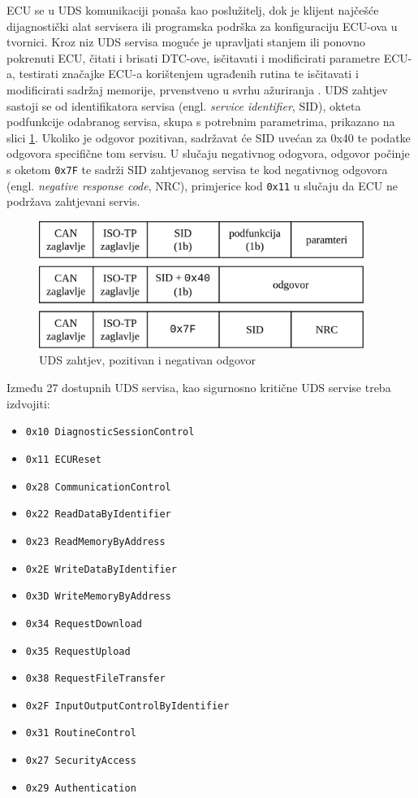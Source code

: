 \documentclass[times, utf8, diplomski, numeric]{fer}
\begin{document}
ECU se u UDS komunikaciji ponaša kao poslužitelj, dok je klijent najčešće dijagnostički alat servisera ili programska podrška za konfiguraciju ECU-ova u tvornici. Kroz niz UDS servisa moguće je upravljati stanjem ili ponovno pokrenuti ECU, čitati i brisati DTC-ove, isčitavati i modificirati parametre ECU-a, testirati značajke ECU-a korištenjem ugrađenih rutina te isčitavati i modificirati sadržaj memorije, prvenstveno u svrhu ažuriranja \cite{falch2022uds}. UDS zahtjev sastoji se od identifikatora servisa (engl. \textit{service identifier}, SID), okteta podfunkcije odabranog servisa, skupa s potrebnim parametrima, prikazano na slici \ref{fig:uds}. Ukoliko je odgovor pozitivan, sadržavat će SID uvećan za 0x40 te podatke odgovora specifične tom servisu. U slučaju negativnog odogvora, odgovor počinje s oketom \texttt{0x7F} te sadrži SID zahtjevanog servisa te kod negativnog odgovora (engl. \textit{negative response code}, NRC), primjerice kod \texttt{0x11} u slučaju da ECU ne podržava zahtjevani servis. 

\bigskip
\begin{figure}[htb]
\centering
\includegraphics[width=300pt]{slike/uds.png}
\caption{UDS zahtjev, pozitivan i negativan odgovor}
\label{fig:uds}
\end{figure}

Između 27 dostupnih UDS servisa, kao sigurnosno kritične UDS servise treba izdvojiti:
\begin{itemize}
    \item \texttt{0x10 DiagnosticSessionControl}
    \item \texttt{0x11 ECUReset}
    \item \texttt{0x28 CommunicationControl}
    \bigskip
    \item \texttt{0x22 ReadDataByIdentifier}
    \item \texttt{0x23 ReadMemoryByAddress}
    \item \texttt{0x2E WriteDataByIdentifier}
    \item \texttt{0x3D WriteMemoryByAddress}
    \bigskip
    \item \texttt{0x34 RequestDownload}
    \item \texttt{0x35 RequestUpload}
    \item \texttt{0x38 RequestFileTransfer}
    \bigskip
    \item \texttt{0x2F InputOutputControlByIdentifier}
    \item \texttt{0x31 RoutineControl}
    \bigskip
    \item \texttt{0x27 SecurityAccess}
    \item \texttt{0x29 Authentication}
\end{itemize}
\end{document}

